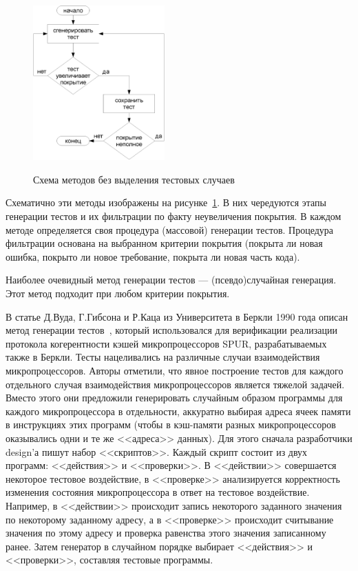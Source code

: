 \begin{figure}[h] \center
  \includegraphics[width=0.45\textwidth]{1.review/methods1}\\
  \caption{Схема методов без выделения тестовых случаев}\label{fig:methods1}
\end{figure}

Схематично эти методы изображены на рисунке~\ref{fig:methods1}. В них чередуются этапы генерации тестов и их фильтрации по факту неувеличения покрытия. В каждом методе определяется своя процедура (массовой) генерации тестов. Процедура фильтрации основана на выбранном критерии покрытия (покрыта ли новая ошибка, покрыто ли новое требование, покрыта ли новая часть кода).

Наиболее очевидный метод генерации тестов --- (псевдо)случайная генерация. Этот метод подходит при любом критерии покрытия.


В статье Д.Вуда, Г.Гибсона и Р.Каца из Университета в Беркли 1990 года описан метод генерации тестов~\cite{Berkeley89}, который использовался для верификации реализации протокола когерентности кэшей микропроцессоров SPUR, разрабатываемых также в Беркли. Тесты нацеливались на различные случаи взаимодействия микропроцессоров. Авторы отметили, что явное построение тестов для каждого отдельного случая взаимодействия микропроцессоров является тяжелой задачей. Вместо этого они предложили генерировать случайным образом программы для каждого микропроцессора в отдельности, аккуратно выбирая адреса ячеек памяти в инструкциях этих программ (чтобы в кэш-памяти разных микропроцессоров оказывались одни и те же <<адреса>> данных). Для этого сначала разработчики design'а пишут набор <<скриптов>>. Каждый скрипт состоит из двух программ: <<действия>> и <<проверки>>. В <<действии>> совершается некоторое тестовое воздействие, в <<проверке>> анализируется корректность изменения состояния микропроцессора в ответ на тестовое воздействие. Например, в <<действии>> происходит запись некоторого заданного значения по некоторому заданному адресу, а в <<проверке>> происходит считывание значения по этому адресу и проверка равенства этого значения записанному ранее. Затем генератор в случайном порядке выбирает <<действия>> и <<проверки>>, составляя тестовые программы.

